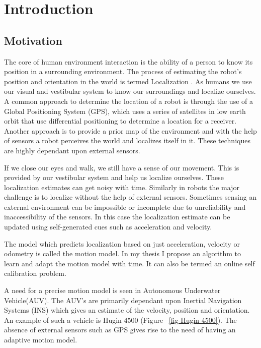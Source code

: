 \documentclass[12pt]{dalcsthesis}
\begin{document}
\mainmatter

\chapter{Introduction}
 





\section{Motivation}
The core of human environment interaction is the ability of a person to know its position in a surrounding environment. The process of estimating the robot's position and orientation in the world is termed Localization \cite{thrun2005probabilistic}. As humans we use our visual and vestibular system to know our surroundings and localize ourselves. A common approach to determine the location of a robot is through the use of a Global Positioning System (GPS), which uses a series of satellites in low earth orbit that use differential positioning to determine a location for a receiver. Another approach is to provide a prior map of the environment and with the help of sensors a robot perceives the world and localizes itself in it. These techniques are highly dependant upon external sensors.

If we close our eyes and walk, we still have a sense of our movement. This is provided by our vestibular system and help us localize ourselves. These localization estimates can get noisy with time. Similarly in robots the major challenge is to localize without the help of external sensors. Sometimes sensing an external environment can be impossible or incomplete due to unreliability and inaccessibility of the sensors. In this case the localization estimate can be updated using self-generated cues such as acceleration and velocity. 

The model which predicts localization based on just acceleration, velocity or odometry is called the motion model. In my thesis I propose an algorithm to learn and adapt the motion model with time. It can also be termed an online self calibration problem. 

A need for a precise motion model is seen in Autonomous Underwater Vehicle(AUV). The AUV's are primarily dependant upon Inertial Navigation Systems (INS) which gives an estimate of the velocity, position and orientation. An example of such a vehicle is Hugin 4500 (Figure ~\ref{fig-Hugin 4500}). The absence of external sensors such as GPS gives rise to the need of having an adaptive motion model.
\end{document}
